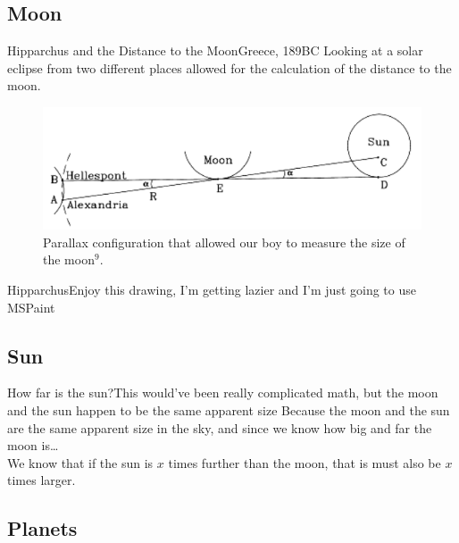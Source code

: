 \documentclass[12pt]{beamer}
\begin{document}
    \subsection{Moon}
        \begin{frame}{Hipparchus and the Distance to the Moon}{Greece, 189BC} \centering
            Looking at a solar eclipse from two different places allowed for the calculation of the distance to the moon.
            \begin{figure}
                \includegraphics[scale=0.5, frame, bb=0 0 430 150]{hipparchus.png}
                \caption{Parallax configuration that allowed our boy to measure the size of the moon$^9$.}
            \end{figure}
        \end{frame}
        \begin{frame}{Hipparchus}{Enjoy this drawing, I'm getting lazier and I'm just going to use MSPaint}
            
        \end{frame}
    \subsection{Sun}
        \begin{frame}{How far is the sun?}{This would've been really complicated math, but the moon and the sun happen to be the same apparent size} \centering
            Because the moon and the sun are the same apparent size in the sky, and since we know how big and far the moon is\ldots\\
            We know that if the sun is $x$ times further than the moon, that is must also be $x$ times larger.\\
        \end{frame}
    \subsection{Planets}
\end{document}
